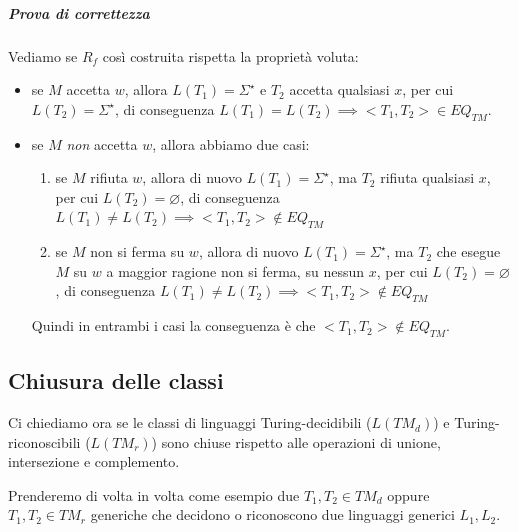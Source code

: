 \subparagraph{Prova di correttezza}

Vediamo se $R_f$ così costruita rispetta la proprietà voluta:

\begin{itemize}
\item se $M$ accetta $w$, allora $L(T_1) = \Sigma^{\star}$ e $T_2$ accetta qualsiasi $x$, per cui $L(T_2) = \Sigma^{\star}$, di conseguenza $L(T_1) = L(T_2) \implies <T_1, T_2> \in EQ_{TM}$.

\item se $M$ \textit{non} accetta $w$, allora abbiamo due casi:
\begin{enumerate}
\item se $M$ rifiuta $w$, allora di nuovo $L(T_1) = \Sigma^{\star}$, ma $T_2$ rifiuta qualsiasi $x$, per cui $L(T_2) = \varnothing$, di conseguenza $L(T_1) \neq L(T_2) \implies <T_1, T_2> \notin EQ_{TM}$

\item se $M$ non si ferma su $w$, allora di nuovo $L(T_1) = \Sigma^{\star}$, ma $T_2$ che esegue $M$ su $w$ a maggior ragione non si ferma, su nessun $x$, per cui $L(T_2) = \varnothing$, di conseguenza $L(T_1) \neq L(T_2) \implies <T_1, T_2> \notin EQ_{TM}$
\end{enumerate}
Quindi in entrambi i casi la conseguenza è che $<T_1, T_2> \notin EQ_{TM}$.
\end{itemize}

\subsection{Chiusura delle classi}

Ci chiediamo ora se le classi di linguaggi Turing-decidibili ($L(TM_d)$) e Turing-riconoscibili ($L(TM_r)$) sono chiuse rispetto alle operazioni di unione, intersezione e complemento. 

Prenderemo di volta in volta come esempio due $T_1, T_2 \in TM_d$ oppure $T_1, T_2 \in TM_r$ generiche che decidono o riconoscono due linguaggi generici $L_1, L_2$.

